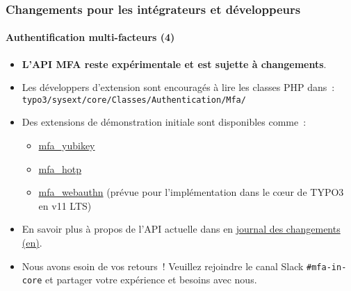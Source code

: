 %

\begin{frame}[fragile]
	\frametitle{Changements pour les intégrateurs et développeurs}
	\framesubtitle{Authentification multi-facteurs (4)}

	\begin{itemize}

		\item \textbf{L'API MFA reste expérimentale et est sujette à changements}.

		\item Les développers d'extension sont encouragés à lire les classes PHP dans~:\newline
			\small\texttt{typo3/sysext/core/Classes/Authentication/Mfa/}\normalsize

		\item Des extensions de démonstration initiale sont disponibles comme~:

			\begin{itemize}\small
				\item \href{https://github.com/derhansen/mfa_yubikey}{mfa\_yubikey}
				\item \href{https://github.com/o-ba/mfa_hotp}{mfa\_hotp}
				\item \href{https://github.com/bnf/mfa_webauthn}{mfa\_webauthn} (prévue pour l'implémentation dans le cœur de TYPO3 en v11 LTS)
			\end{itemize}\normalsize

		\item En savoir plus à propos de l'API actuelle dans en
			\href{https://docs.typo3.org/c/typo3/cms-core/master/en-us/Changelog/11.1/Feature-93526-MultiFactorAuthentication.html}{journal des changements (en)}.

		\item Nous avons esoin de vos retours~! Veuillez rejoindre le canal Slack \texttt{\#mfa-in-core}
			et partager votre expérience et besoins avec nous.

	\end{itemize}

\end{frame}

